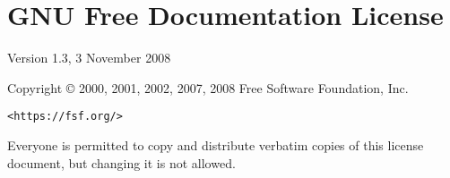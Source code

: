 \documentclass[]{report}
\theoremstyle{definition}
\theoremstyle{remark}
\theoremstyle{plain}
\numberwithin{equation}{chapter}
\begin{document}
\pagebreak



\scriptsize

\section*{\centering GNU Free Documentation License}

\begin{center}
	Version 1.3, 3 November 2008

	Copyright \copyright{} 2000, 2001, 2002, 2007, 2008  Free Software Foundation, Inc.

	\bigskip

	\texttt{<https://fsf.org/>}

	\bigskip

	Everyone is permitted to copy and distribute verbatim copies
	of this license document, but changing it is not allowed.
\end{center}
\end{document}
